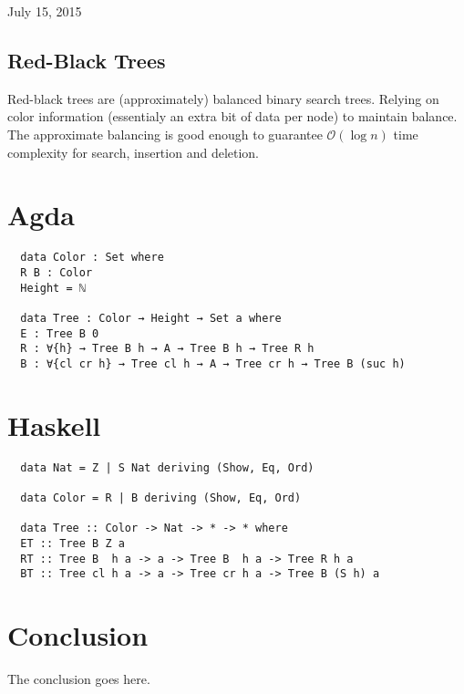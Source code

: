\documentclass[journal]{../IEEEtemplate/IEEEtran}
\begin{document}
\hfill July 15, 2015

\subsection{Red-Black Trees}

Red-black trees are (approximately) balanced binary search trees.
Relying on color information (essentialy an extra bit of data per node) to
maintain balance.
The approximate balancing is good enough to guarantee $\mathcal{O}(\log{}n)$
time complexity for search, insertion and deletion.


\section{Agda}

\begin{verbatim}
  data Color : Set where
  R B : Color
  Height = ℕ

  data Tree : Color → Height → Set a where
  E : Tree B 0
  R : ∀{h} → Tree B h → A → Tree B h → Tree R h
  B : ∀{cl cr h} → Tree cl h → A → Tree cr h → Tree B (suc h)
\end{verbatim}


\section{Haskell}

\begin{verbatim}
  data Nat = Z | S Nat deriving (Show, Eq, Ord)

  data Color = R | B deriving (Show, Eq, Ord)

  data Tree :: Color -> Nat -> * -> * where
  ET :: Tree B Z a
  RT :: Tree B  h a -> a -> Tree B  h a -> Tree R h a
  BT :: Tree cl h a -> a -> Tree cr h a -> Tree B (S h) a
\end{verbatim}


\section{Conclusion}
The conclusion goes here.

\end{document}
